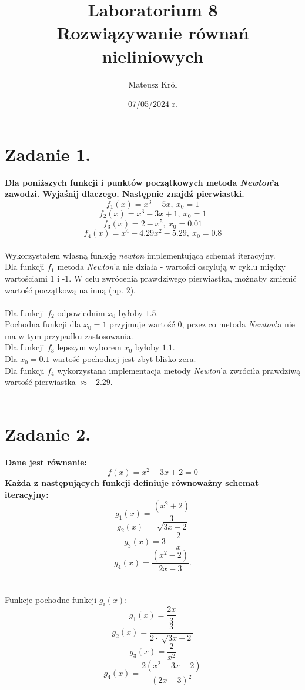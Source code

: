 \documentclass{article}
\title{%
Laboratorium 8\\
  \huge Rozwiązywanie równań nieliniowych}
\author{Mateusz Król}
\date{07/05/2024 r.}
\begin{document}
\maketitle

 
\section*{Zadanie 1.}
\textbf{Dla poniższych funkcji i punktów początkowych metoda 
\textit{Newton}'a
zawodzi. Wyjaśnij dlaczego. Następnie znajdź pierwiastki.
$$f_1(x) = x^3-5x,\ x_0=1$$
$$f_2(x) = x^3-3x+1,\ x_0=1$$
$$f_3(x) = 2-x^5,\ x_0=0.01$$
$$f_4(x) = x^4-4.29x^2-5.29,\ x_0=0.8$$} \\
\null\quad
Wykorzystałem własną funkcję \textit{newton} implementującą schemat iteracyjny. \\
Dla funkcji $f_1$ metoda \textit{Newton}'a nie działa - wartości oscylują
w cyklu między wartościami 1 i -1. W celu zwrócenia
prawdziwego pierwiastka, możnaby zmienić wartość początkową na inną (np. $2$). \\\\
Dla funkcji $f_2$ odpowiednim $x_0$ byłoby $1.5$.\\
Pochodna funkcji dla $x_0=1$ przyjmuje wartość $0$,
przez co metoda \textit{Newton}'a nie ma w tym przypadku
zastosowania. \\
Dla funkcji $f_3$ lepszym wyborem $x_0$ byłoby $1.1$. \\
Dla $x_0=0.1$ wartość pochodnej jest zbyt blisko zera. \\
Dla funkcji $f_4$ wykorzystana implementacja
metody \textit{Newton}'a zwróciła prawdziwą wartość pierwiastka $\approx -2.29$.\\\\


\section*{Zadanie 2.}
\textbf{Dane jest równanie: $$f(x)=x^2-3x+2=0$$
Każda z następujących funkcji definiuje równoważny schemat iteracyjny:
$$g_1(x)=\frac{(x^2+2)}{3}$$
$$g_2(x)=\sqrt[]{3x-2}$$
$$g_3(x)=3-\frac{2}{x}$$
$$g_4(x)=\frac{(x^2-2)}{2x-3}.$$
}
\\\\
\null\quad Funkcje pochodne funkcji $g_i(x)$:
$$g_1(x)=\frac{2x}{3}$$
$$g_2(x)=\frac{3}{2\cdot \sqrt[]{3x-2}}$$
$$g_3(x)=\frac{2}{x^2}$$
$$g_4(x)=\frac{2(x^2-3x+2)}{(2x-3)^2}$$
\end{document}
